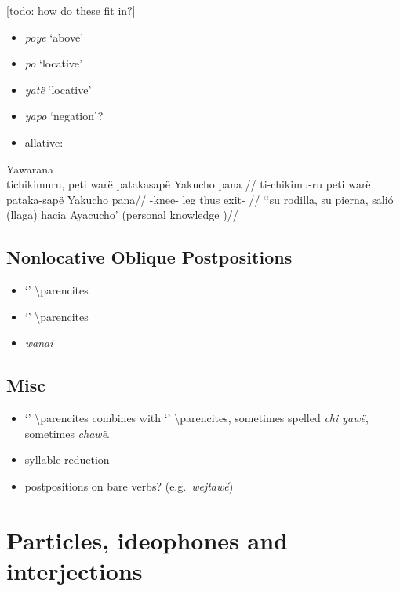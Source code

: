 \documentclass{memoir}
\begin{document}
{[}todo: how do these fit in?{]}

\begin{itemize}
\item
  \emph{poye} `above'
\item
  \emph{po} `locative'
\item
  \emph{yatë} `locative'
\item
  \emph{yapo} `negation'?
\item
  allative:
\end{itemize}

\ex  Yawarana  \\\label{histpajirdi-186}
\begingl \glpreamble tichikimuru, peti warë patakasapë Yakucho pana //
\gla ti-chikimu-ru peti warë pataka-sapë Yakucho pana//
\glb {}-knee- leg thus exit-  //
\glft ‘‘su rodilla, su pierna, salió (llaga) hacia Ayacucho’ (personal knowledge
)//
\endgl
\xe

\section{Nonlocative Oblique Postpositions}

\begin{itemize}
\tightlist
\item
   `' \textbackslash parencites
\item
   `' \textbackslash parencites
\item
  \emph{wanai}
\end{itemize}

\section{Misc}

\begin{itemize}
\tightlist
\item
   `' \textbackslash parencites combines with
   `' \textbackslash parencites, sometimes spelled
  \emph{chi yawë}, sometimes \emph{chawë}.
\item
  syllable reduction
\item
  postpositions on bare verbs? (e.g.~\emph{wejtawë})
\end{itemize}

\chapter{\texorpdfstring{Particles, ideophones and interjections
\label{partideo}}{Particles, ideophones and interjections }}
\end{document}
